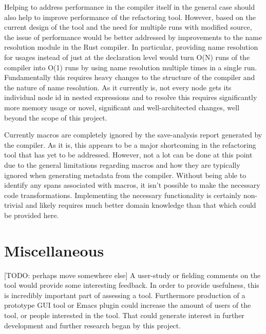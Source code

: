 
Helping to address performance in the compiler itself in the general case should also help to improve performance of the refactoring tool. However, based on the current design of the tool and the need for multiple runs with modified source, the issue of performance would be better addressed by improvements to the name resolution module in the Rust compiler. In particular, providing name resolution for usages instead of just at the declaration level would turn O(N) runs of the compiler into O(1) runs by using name resolution multiple times in a single run. Fundamentally this requires heavy changes to the structure of the compiler and the nature of name resolution. As it currently is, not every node gets its individual node id in nested expressions and to resolve this requires significantly more memory usage or novel, significant and well-architected changes, well beyond the scope of this project.


Currently macros are completely ignored by the save-analysis report generated by the compiler. As it is, this appears to be a major shortcoming in the refactoring tool that has yet to be addressed. However, not a lot can be done at this point due to the general limitations regarding macros and how they are typically ignored when generating metadata from the compiler. Without being able to identify any spans associated with macros, it isn't possible to make the necessary code transformations. Implementing the necessary functionality is certainly non-trivial and likely requires much better domain knowledge than that which could be provided here.

\section{Miscellaneous}

[TODO: perhaps move somewhere else]
A user-study or fielding comments on the tool would provide some interesting feedback. In order to provide usefulness, this is incredibly important part of assessing a tool. Furthermore production of a prototype GUI tool or Emacs plugin could increase the amount of users of the tool, or people interested in the tool. That could generate interest in further development and further research began by this project.

